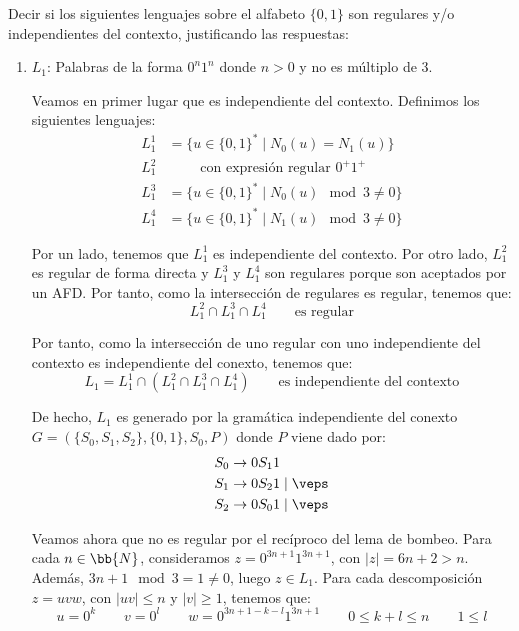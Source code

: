 \documentclass[12pt]{article}
\begin{document}
\begin{ejercicio}[1.25 puntos]
    Decir si los siguientes lenguajes sobre el alfabeto $\{0, 1\}$ son regulares y/o independientes del contexto, justificando las respuestas:
    \begin{enumerate}
        \item $L_1$: Palabras de la forma $0^n1^n$ donde $n > 0$ y no es múltiplo de $3$.
        
        Veamos en primer lugar que es independiente del contexto. Definimos los siguientes lenguajes:
        \begin{align*}
            L_1^1 &= \{u\in \{0,1\}^*\mid N_0(u)=N_1(u)\}\\
            L_1^2 & \qquad \text{ con expresión regular } 0^+1^+\\
            L_1^3 &= \{u\in \{0,1\}^*\mid N_0(u)\mod 3\neq 0\}\\
            L_1^4 &= \{u\in \{0,1\}^*\mid N_1(u)\mod 3\neq 0\}
        \end{align*}

        Por un lado, tenemos que $L_1^1$ es independiente del contexto. Por otro lado, $L_1^2$ es regular de forma directa y $L_1^3$ y $L_1^4$ son regulares porque son aceptados por un AFD. Por tanto, como la intersección de regulares es regular, tenemos que:
        \begin{equation*}
            L_1^2 \cap L_1^3 \cap L_1^4 \qquad \text{es regular}
        \end{equation*}

        Por tanto, como la intersección de uno regular con uno independiente del contexto es independiente del conexto, tenemos que:
        \begin{equation*}
            L_1 = L_1^1 \cap \left(L_1^2 \cap L_1^3 \cap L_1^4\right) \qquad \text{es independiente del contexto}
        \end{equation*}

        De hecho, $L_1$ es generado por la gramática independiente del conexto $G=(\{S_0,S_1,S_2\}, \{0,1\}, S_0, P)$ donde $P$ viene dado por:
        \begin{align*}
            S_0 &\rightarrow 0S_1 1\\
            S_1 &\rightarrow 0S_2 1\mid \veps\\
            S_2 &\rightarrow 0S_0 1\mid \veps
        \end{align*}

        Veamos ahora que no es regular por el recíproco del lema de bombeo. Para cada $n\in \bb{N}$, consideramos $z=0^{3n+1}1^{3n+1}$, con $|z|=6n+2>n$. Además, $3n+1\mod 3=1\neq 0$, luego $z\in L_1$. Para cada descomposición $z=uvw$, con $|uv|\leq n$ y $|v|\geq 1$, tenemos que:
        \begin{equation*}
            u=0^k \qquad v=0^l\qquad w=0^{3n+1-k-l}1^{3n+1}
            \qquad 0\leq k+l\leq n \qquad 1\leq l
        \end{equation*}


\end{enumerate}
\end{ejercicio}
\end{document}

